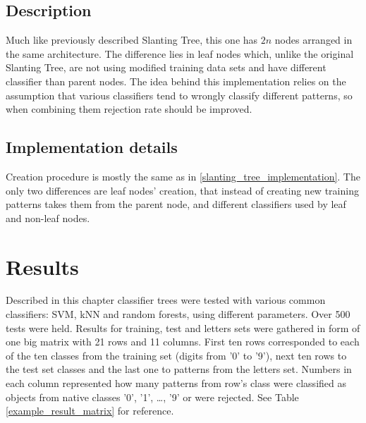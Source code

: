 \subsection{Description}

Much like previously described Slanting Tree, this one has $ 2n $ nodes arranged in the same architecture. The difference lies in leaf nodes which, unlike the original Slanting Tree, are not using modified training data sets and have different classifier than parent nodes. The idea behind this implementation relies on the assumption that various classifiers tend to wrongly classify different patterns, so when combining them rejection rate should be improved.

\subsection{Implementation details}

Creation procedure is mostly the same as in \ref{slanting_tree_implementation}. The only two differences are leaf nodes' creation, that instead of creating new training patterns takes them from the parent node, and different classifiers used by leaf and non-leaf nodes.

\section{Results}

Described in this chapter classifier trees were tested with various common classifiers: SVM, kNN and random forests, using different parameters. Over 500 tests were held. Results for training, test and letters sets were gathered in form of one big matrix with 21 rows and 11 columns. First ten rows corresponded to each of the ten classes from the training set (digits from '0' to '9'), next ten rows to the test set classes and the last one to patterns from the letters set. Numbers in each column represented how many patterns from row's class were classified as objects from native classes '0', '1', \dots, '9' or were rejected. See Table \ref{example_result_matrix} for reference.

